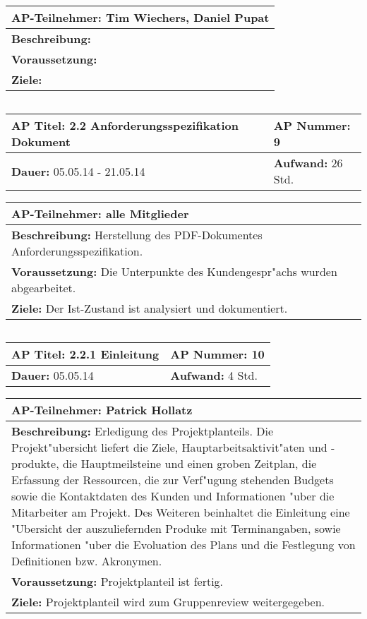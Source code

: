 \begin{tabular}{|p{15.3cm}|}
\hline
\textbf{AP-Teilnehmer: }Tim Wiechers, Daniel Pupat\\
\hline
\textbf{Beschreibung: } \\
\hline
\textbf{Voraussetzung: }\\
\hline 
\textbf{Ziele: }\\
\hline 
\end{tabular}
\begin{verbatim}

\end{verbatim}
\begin{tabular}{|p{7.43cm}|p{7.43cm}|}
\hline
\textbf{AP Titel: }2.2 Anforderungsspezifikation Dokument & \textbf{AP Nummer: }9\\ 
\hline
\textbf{Dauer: }05.05.14 - 21.05.14 & \textbf{Aufwand: }26 Std.\\
\hline
\end{tabular}
\begin{tabular}{|p{15.3cm}|}
\hline
\textbf{AP-Teilnehmer: }alle Mitglieder\\
\hline
\textbf{Beschreibung: } Herstellung des PDF-Dokumentes Anforderungsspezifikation.\\
\hline
\textbf{Voraussetzung: }Die Unterpunkte des Kundengespr"achs wurden abgearbeitet. \\
\hline 
\textbf{Ziele: }Der Ist-Zustand ist analysiert und dokumentiert.\\
\hline 
\end{tabular}
\begin{verbatim}

\end{verbatim}
\begin{tabular}{|p{7.43cm}|p{7.43cm}|}
\hline
\textbf{AP Titel: }2.2.1 Einleitung & \textbf{AP Nummer: }10\\ 
\hline
\textbf{Dauer: }05.05.14 & \textbf{Aufwand: }4 Std.\\
\hline
\end{tabular}
\begin{tabular}{|p{15.3cm}|}
\hline
\textbf{AP-Teilnehmer: }Patrick Hollatz\\
\hline
\textbf{Beschreibung: }Erledigung des Projektplanteils. Die Projekt"ubersicht liefert die Ziele, Hauptarbeitsaktivit"aten und -produkte, die Hauptmeilsteine und einen groben Zeitplan, die Erfassung der Ressourcen, die zur Verf"ugung stehenden Budgets sowie die Kontaktdaten des Kunden und Informationen "uber die Mitarbeiter am Projekt. Des Weiteren beinhaltet die Einleitung eine "Ubersicht der auszuliefernden Produke mit Terminangaben, sowie Informationen "uber die Evoluation des Plans und die Festlegung von Definitionen bzw. Akronymen.\\
\hline
\textbf{Voraussetzung: }Projektplanteil ist fertig.\\
\hline 
\textbf{Ziele: }Projektplanteil wird zum Gruppenreview weitergegeben.\\
\hline 
\end{tabular}
